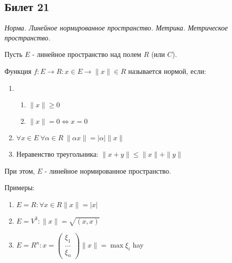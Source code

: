 \subsection{Билет 21}

\textit{Норма. Линейное нормированное пространство. Метрика. Метрическое пространство.}

Пусть $E$ - линейное пространство над полем $R$ (или $C$). 

Функция $f:E\to R: x \in E \to \| x \| \in R$ называется нормой, если:
\begin{enumerate}
 \item \begin{enumerate}
        \item $\|x\| \ge 0$
        \item $\|x\| = 0 \Leftrightarrow x = 0$
       \end{enumerate}
 \item $\forall x \in E ~ \forall \alpha \in R ~ \|\alpha x \| = \left| \alpha \right| \|x\|$
 \item Неравенство треугольника: $\|x+y\| \le \|x\| + \|y\|$
\end{enumerate}

При этом, $E$ - линейное нормированное пространство.

Примеры:

\begin{enumerate}
 \item $E = R: \forall x \in R \|x\| = \left| x \right|$
 \item $E = V^3: \|x\| = \sqrt{(x,x)}$
 \item $E = R^n: x = \left(\begin{matrix}
                            \mbox{$\xi_1$}\\
                            \mbox{...}\\
                            \mbox{$\xi_n$}
                           \end{matrix}\right) \|x\| = \max \xi_i$ hay

\end{enumerate}

